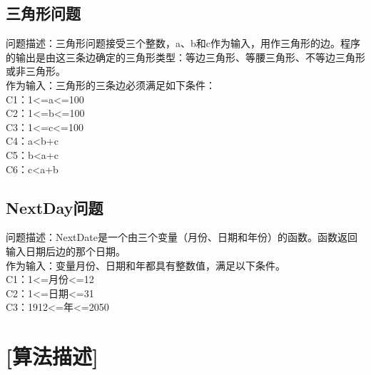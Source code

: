 \documentclass{article}
\begin{document}
\subsection{三角形问题}

问题描述：三角形问题接受三个整数，a、b和c作为输入，用作三角形的边。程序的输出是由这三条边确定的三角形类型：等边三角形、等腰三角形、不等边三角形或非三角形。\\

作为输入：三角形的三条边必须满足如下条件：\\

C1：1<=a<=100\\

C2：1<=b<=100\\

C3：1<=c<=100\\

C4：a<b+c\\

C5：b<a+c\\

C6：c<a+b\\

\subsection{NextDay问题}

问题描述：NextDate是一个由三个变量（月份、日期和年份）的函数。函数返回输入日期后边的那个日期。\\

作为输入：变量月份、日期和年都具有整数值，满足以下条件。\\

C1：1<=月份<=12\\

C2：1<=日期<=31\\

C3：1912<=年<=2050\\

\section{[算法描述]}
\end{document}
